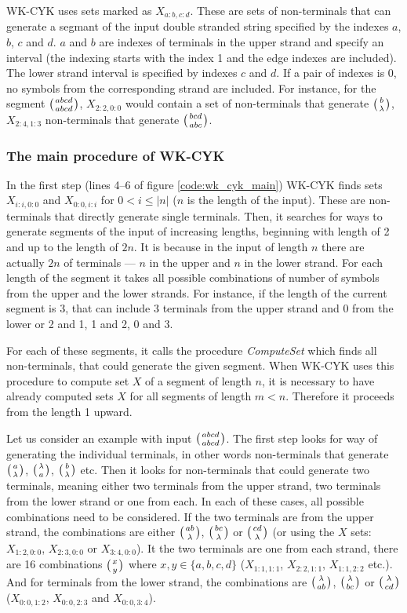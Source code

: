 WK-CYK uses sets marked as $X_{a:b,c:d}$. These are sets of non-terminals that can generate a segmant of the input double stranded string specified by the indexes $a$, $b$, $c$ and $d$. $a$ and $b$ are indexes of terminals in the upper strand and specify an interval (the indexing starts with the index 1 and the edge indexes are included). The lower strand interval is specified by indexes $c$ and $d$. If a pair of indexes is 0, no symbols from the corresponding strand are included. For instance, for the segment $\wkpair{abcd}{abcd}$, $X_{2:2,0:0}$ would contain a set of non-terminals that generate $\wkpair{b}{\lambda}$, $X_{2:4,1:3}$ non-terminals that generate $\wkpair{bcd}{abc}$.

\subsubsection{The main procedure of WK-CYK}
In the first step (lines 4--6 of figure \ref{code:wk_cyk_main}) WK-CYK finds sets $X_{i:i,0:0}$ and $X_{0:0,i:i}$ for $0 < i \leq |n|$ ($n$ is the length of the input). These are non-terminals that directly generate single terminals. Then, it searches for ways to generate segments of the input of increasing lengths, beginning with length of 2 and up to the length of $2n$. It is because in the input of length $n$ there are actually $2n$ of terminals --- $n$ in the upper and $n$ in the lower strand. For each length of the segment it takes all possible combinations of number of symbols from the upper and the lower strands. For instance, if the length of the current segment is 3, that can include 3 terminals from the upper strand and 0 from the lower or 2 and 1, 1 and 2, 0 and 3.

For each of these segments, it calls the procedure \textit{ComputeSet} which finds all non-terminals, that could generate the given segment. When WK-CYK uses this procedure to compute set $X$ of a segment of length $n$, it is necessary to have already computed sets $X$ for all segments of length $m < n$. Therefore it proceeds from the length 1 upward.

Let us consider an example with input $\wkpair{abcd}{abcd}$. The first step looks for way of generating the individual terminals, in other words non-terminals that generate $\wkpair{a}{\lambda}$, $\wkpair{\lambda}{a}$, $\wkpair{b}{\lambda}$ etc. Then it looks for non-terminals that could generate two terminals, meaning either two terminals from the upper strand, two terminals from the lower strand or one from each. In each of these cases, all possible combinations need to be considered. If the two terminals are from the upper strand, the combinations are either $\wkpair{ab}{\lambda}$, $\wkpair{bc}{\lambda}$ or $\wkpair{cd}{\lambda}$ (or using the $X$ sets: $X_{1:2,0:0}$, $X_{2:3,0:0}$ or $X_{3:4,0:0}$). It the two terminals are one from each strand, there are 16 combinations $\wkpair{x}{y}$ where $x, y \in \{a, b, c, d\}$ ($X_{1:1,1:1}$, $X_{2:2,1:1}$, $X_{1:1,2:2}$ etc.). And for terminals from the lower strand, the combinations are $\wkpair{\lambda}{ab}$, $\wkpair{\lambda}{bc}$ or $\wkpair{\lambda}{cd}$ ($X_{0:0,1:2}$, $X_{0:0,2:3}$ and $X_{0:0,3:4}$).

